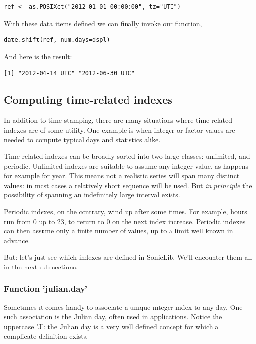 \documentclass[a4paper,10pt]{book}
\begin{document}
\begin{verbatim}
ref <- as.POSIXct("2012-01-01 00:00:00", tz="UTC")
\end{verbatim}

\noindent With these data items defined we can finally invoke our function,

\begin{verbatim}
date.shift(ref, num.days=dspl)
\end{verbatim}

\noindent And here is the result:

\begin{verbatim}
[1] "2012-04-14 UTC" "2012-06-30 UTC"
\end{verbatim}



\subsection{Computing time-related indexes}

In addition to time stamping, there are many situations where time-related indexes are of some utility. One example is when integer or factor values are needed to compute typical days and statistics alike.

Time related indexes can be broadly sorted into two large classes: unlimited, and periodic. Unlimited indexes are suitable to assume any integer value, as happens for example for year. This means not a realistic series will span many distinct values: in most cases a relatively short sequence will be used. But \emph{in principle} the possibility of spanning an indefinitely large interval exists.

Periodic indexes, on the contrary, wind up after some times. For example, hours run from 0 up to 23, to return to 0 on the next index increase. Periodic indexes can then assume only a finite number of values, up to a limit well known in advance.

But: let's just see which indexes are defined in SonicLib. We'll encounter them all in the next sub-sections.

\subsubsection{Function 'julian.day'}

Sometimes it comes handy to associate a unique integer index to any day. One such association is the Julian day, often used in applications. Notice the uppercase 'J': the Julian day is a very well defined concept for which a complicate definition exists.
\end{document}
